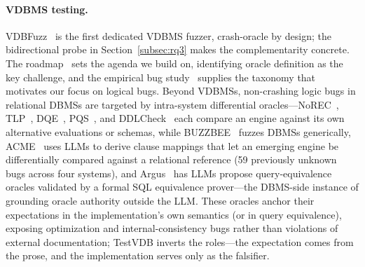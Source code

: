 \documentclass[acmsmall,screen,review,anonymous]{acmart}
\newcommand{\system}{TestVDB}
\begin{document}
\paragraph{VDBMS testing.}
VDBFuzz~\cite{vdbfuzz26} is the first dedicated VDBMS fuzzer, crash-oracle by design; the bidirectional probe in Section~\ref{subsec:rq3} makes the complementarity concrete. The roadmap~\cite{roadmap25} sets the agenda we build on, identifying oracle definition as the key challenge, and the empirical bug study~\cite{bugstudy25} supplies the taxonomy that motivates our focus on logical bugs. Beyond VDBMSs, non-crashing logic bugs in relational DBMSs are targeted by intra-system differential oracles---NoREC~\cite{norec20}, TLP~\cite{tlp20}, DQE~\cite{dqe23}, PQS~\cite{pqs20}, and DDLCheck~\cite{ddlcheck25} each compare an engine against its own alternative evaluations or schemas, while BUZZBEE~\cite{buzzbee24} fuzzes DBMSs generically, ACME~\cite{acme26} uses LLMs to derive clause mappings that let an emerging engine be differentially compared against a relational reference (59 previously unknown bugs across four systems), and Argus~\cite{argus25} has LLMs propose query-equivalence oracles validated by a formal SQL equivalence prover---the DBMS-side instance of grounding oracle authority outside the LLM. These oracles anchor their expectations in the implementation's own semantics (or in query equivalence), exposing optimization and internal-consistency bugs rather than violations of external documentation; \system{} inverts the roles---the expectation comes from the prose, and the implementation serves only as the falsifier.
\end{document}
